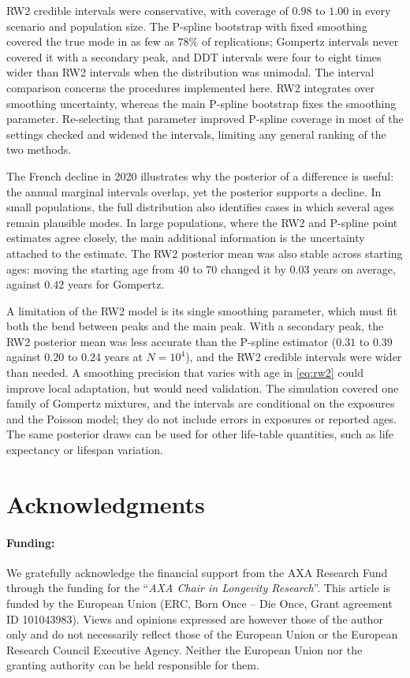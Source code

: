 \documentclass[12pt, letterpaper]{article}
\begin{document}
RW2 credible intervals were conservative, with coverage of $0.98$ to $1.00$ in every scenario and population size. The P-spline bootstrap with fixed smoothing covered the true mode in as few as $78\%$ of replications; Gompertz intervals never covered it with a secondary peak, and DDT intervals were four to eight times wider than RW2 intervals when the distribution was unimodal. The interval comparison concerns the procedures implemented here. RW2 integrates over smoothing uncertainty, whereas the main P-spline bootstrap fixes the smoothing parameter. Re-selecting that parameter improved P-spline coverage in most of the settings checked and widened the intervals, limiting any general ranking of the two methods.

The French decline in 2020 illustrates why the posterior of a difference is useful: the annual marginal intervals overlap, yet the posterior supports a decline. In small populations, the full distribution also identifies cases in which several ages remain plausible modes. In large populations, where the RW2 and P-spline point estimates agree closely, the main additional information is the uncertainty attached to the estimate. The RW2 posterior mean was also stable across starting ages: moving the starting age from 40 to 70 changed it by $0.03$ years on average, against $0.42$ years for Gompertz.

A limitation of the RW2 model is its single smoothing parameter, which must fit both the bend between peaks and the main peak. With a secondary peak, the RW2 posterior mean was less accurate than the P-spline estimator ($0.31$ to $0.39$ against $0.20$ to $0.24$ years at $N = 10^4$), and the RW2 credible intervals were wider than needed. A smoothing precision that varies with age in \eqref{eq:rw2} could improve local adaptation, but would need validation. The simulation covered one family of Gompertz mixtures, and the intervals are conditional on the exposures and the Poisson model; they do not include errors in exposures or reported ages. The same posterior draws can be used for other life-table quantities, such as life expectancy or lifespan variation.

\section*{Acknowledgments}

\paragraph*{Funding:}
We gratefully acknowledge the financial support from the AXA Research Fund through the funding for the “\textit{AXA Chair in Longevity Research}”. This article is funded by the European Union (ERC, Born Once – Die Once, Grant agreement ID 101043983). Views and opinions expressed are however those of the author only and do not necessarily reflect those of the European Union or the European Research Council Executive Agency. Neither the European Union nor the granting authority can be held responsible for them.
\end{document}
